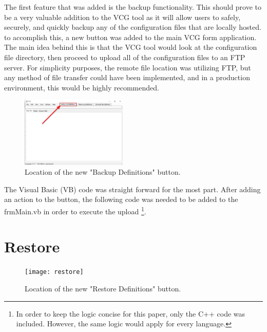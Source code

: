 \documentclass[letterpaper,twocolumn,10pt]{article}
\begin{document}
The first feature that was added is the backup functionality. This should prove to be a very valuable addition to the VCG tool as it will allow users to safely, securely, and quickly backup any of the configuration files that are locally hosted. to accomplish this, a new button was added to the main VCG form application. The main idea behind this is that the VCG tool would look at the configuration file directory, then proceed to upload all of the configuration files to an FTP server. For simplicity purposes, the remote file location was utilizing FTP, but any method of file transfer could have been implemented, and in a production environment, this would be highly recommended. 

\begin{figure}[h]
\centering
\includegraphics[width=0.45\textwidth]{backup}
\caption{\label{fig:backup}Location of the new "Backup Definitions" button.}
\end{figure}

The Visual Basic (VB) code was straight forward for the most part. After adding an action to the button, the following code was needed to be added to the frmMain.vb in order to execute the upload%
\footnote{In order to keep the logic concise for this paper, only the C++ code was included. However, the same logic would apply for every language.}. 



\section{Restore}

\begin{figure}[h]
\centering
\texttt{[image: restore]}
\caption{\label{fig:restore}Location of the new "Restore Definitions" button.}
\end{figure}
\end{document}
